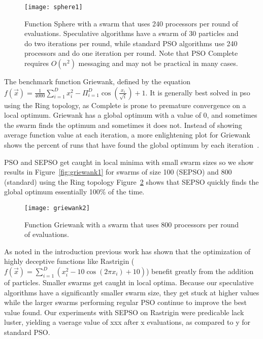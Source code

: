 \documentclass{llncs}
\newcommand{\fig}[1]{Figure~\ref{fig:#1}}
\begin{document}
\begin{figure}
  \centering
  \texttt{[image: sphere1]}
  \caption{Function Sphere with a swarm that uses 240 processors per round of
  evaluations.  Speculative algorithms have a swarm of 30 particles and do two
  iterations per round, while standard PSO algorithms use 240 processors and do
  one iteration per round. Note that PSO Complete requires $O(n^2)$ messaging
  and may not be practical in many cases.}
  \label{fig:sphere1}
\end{figure}

The benchmark function Griewank, defined by the equation $f(\Vec{x}) =
\frac{1}{4000} \sum_{i=1}^D x_i^2 - \Pi_{i=1}^D \cos\left(\frac{x_i}{\sqrt{i}}
\right) + 1$.  It is generally best solved in pso using the Ring topology,
as Complete is prone to premature convergence
on a local optimum.  Griewank has a global optimum with a value of 0, and
sometimes the swarm finds the optimum and sometimes it does not.  Instead of
showing average function value at each iteration, a more enlightening plot for
Griewank shows the percent of runs that have found the global optimum by each
iteration~\cite{bratton-2007-defining-a-standard-for-pso}. 

PSO and SEPSO get caught in local minima with small swarm sizes so
we show results in \fig{griewank1} for swarms of size 100 (SEPSO) and 800 (standard)
using the Ring topology 
\fig{griewank2} shows that SEPSO quickly finds
the global optimum essentially 100\% of the time.

\begin{figure}
  \centering
  \texttt{[image: griewank2]}
  \caption{Function Griewank with a swarm that uses 800 processors per round of
  evaluations.}
  \label{fig:griewank2}
\end{figure}

As noted in the introduction previous work has shown that the optimization of highly
deceptive functions like Rastrigin
($f(\Vec{x}) = \sum_{i=1}^D \left(x_i^2 - 10\cos\left(2\pi x_i\right) + 10\right)$)
benefit greatly from the addition of particles. 
Smaller swarms get caught
in local optima.  Because our speculative algorithms have a significantly
smaller swarm size, they get stuck at higher values while the larger swarms
performing regular PSO continue to improve the best value found.
Our experiments with SEPSO on Rastrigin were predicable lack luster,
yielding a vaerage value of xxx after x evaluations, as compared to y for 
standard PSO.
\end{document}
